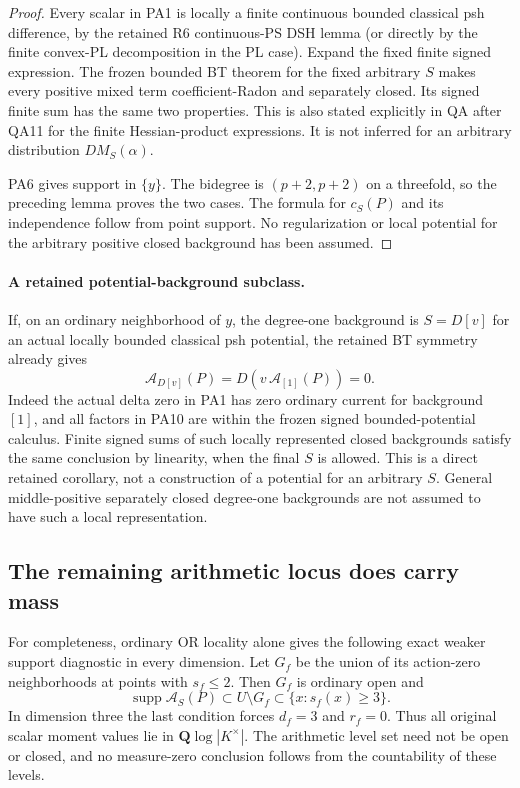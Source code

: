 \begin{proof}
Every scalar in PA1 is locally a finite continuous bounded
classical psh difference, by the retained R6 continuous-PS
DSH lemma (or directly by the finite convex-PL decomposition
in the PL case).  Expand the fixed finite signed expression.
The frozen bounded BT theorem for the fixed arbitrary $S$
makes every positive mixed term coefficient-Radon and separately
closed.  Its signed finite sum has the same two properties.
This is also stated explicitly in QA after QA11 for the
finite Hessian-product expressions.  It is not inferred for
an arbitrary distribution $D M_S(\alpha)$.

PA6 gives support in $\{y\}$.  The bidegree is $(p+2,p+2)$
on a threefold, so the preceding lemma proves the two cases.
The formula for $c_S(P)$ and its independence follow from
point support.  No regularization or local potential for the
arbitrary positive closed background has been assumed.
\end{proof}

\paragraph{A retained potential-background subclass.}
If, on an ordinary neighborhood of $y$, the degree-one
background is $S=D[v]$ for an actual locally bounded classical
psh potential, the retained BT symmetry already gives
\[
 \mathcal A_{D[v]}(P)
       =D\!\left(v\,\mathcal A_{[1]}(P)\right)=0.
 \tag{PA10}
\]
Indeed the actual delta zero in PA1 has zero ordinary current
for background $[1]$, and all factors in PA10 are within the
frozen signed bounded-potential calculus.  Finite signed sums
of such locally represented closed backgrounds satisfy the
same conclusion by linearity, when the final $S$ is allowed.
This is a direct retained corollary, not a construction of a
potential for an arbitrary $S$.  General middle-positive
separately closed degree-one backgrounds are not assumed to
have such a local representation.

\subsection{The remaining arithmetic locus does carry mass}

For completeness, ordinary OR locality alone gives the
following exact weaker support diagnostic in every dimension.
Let $G_f$ be the union of its action-zero neighborhoods at
points with $s_f\le2$.  Then $G_f$ is ordinary open and
\[
             \operatorname{supp}\mathcal A_S(P)
                     \subset U\setminus G_f
                     \subset\{x:s_f(x)\ge3\}.
 \tag{PA11}
\]
In dimension three the last condition forces
$d_f=3$ and $r_f=0$.  Thus all original scalar moment values
lie in $\mathbf Q\log|K^\times|$.  The arithmetic level set
need not be open or closed, and no measure-zero conclusion
follows from the countability of these levels.

